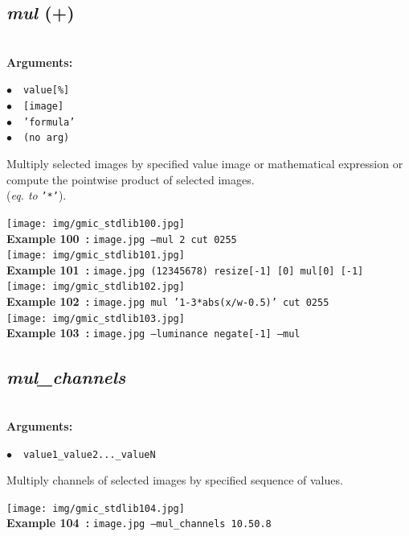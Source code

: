 \documentclass[a4paper,10.5pt,twoside]{book}
\def\comma{\discretionary{,}{}{,}}
\newcommand{\Cb}[1]{\textcolor{cb}{#1}}
\begin{document}
\subsection{\emph{mul} (+)}\vspace*{-0.7em}
~\\\textbf{\Cb{Arguments: }}\begin{flushleft}
{\small \Cb{\hspace*{0.5cm}$\bullet$~~\texttt{value[\%]}}}~~~\\
{\small \Cb{\hspace*{0.5cm}$\bullet$~~\texttt{[image]}}}~~~\\
{\small \Cb{\hspace*{0.5cm}$\bullet$~~\texttt{'formula'}}}~~~\\
{\small \Cb{\hspace*{0.5cm}$\bullet$~~\texttt{(no arg)}}}\end{flushleft}
Multiply selected images by specified value{\comma} image or mathematical expression{\comma}
or compute the pointwise product of selected images.
~\\(\emph{eq. to} {\small \texttt{'*'}}).
\begin{center}\texttt{[image: img/gmic\_stdlib100.jpg]}\\
{\footnotesize \textbf{Example 100~:} \texttt{image.jpg --mul 2 cut 0{\comma}255}}
\\\texttt{[image: img/gmic\_stdlib101.jpg]}\\
{\footnotesize \textbf{Example 101~:} \texttt{image.jpg (1{\comma}2{\comma}3{\comma}4{\comma}5{\comma}6{\comma}7{\comma}8) resize[-1] [0] mul[0] [-1]}}
\\\texttt{[image: img/gmic\_stdlib102.jpg]}\\
{\footnotesize \textbf{Example 102~:} \texttt{image.jpg mul '1-3*abs(x/w-0.5)' cut 0{\comma}255}}
\\\texttt{[image: img/gmic\_stdlib103.jpg]}\\
{\footnotesize \textbf{Example 103~:} \texttt{image.jpg --luminance negate[-1] --mul}}
\end{center}

\subsection{\emph{mul\_channels} }\vspace*{-0.7em}
~\\\textbf{\Cb{Arguments: }}\begin{flushleft}
{\small \Cb{\hspace*{0.5cm}$\bullet$~~\texttt{value1{\comma}\_value2{\comma}...{\comma}\_valueN}}}\end{flushleft}
Multiply channels of selected images by specified sequence of values.
\begin{center}\texttt{[image: img/gmic\_stdlib104.jpg]}\\
{\footnotesize \textbf{Example 104~:} \texttt{image.jpg --mul\_channels 1{\comma}0.5{\comma}0.8}}
\end{center}
\end{document}
